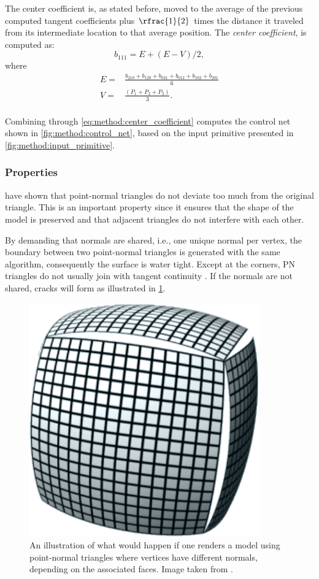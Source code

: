 	The center coefficient is, as stated before, moved to the average of the previous computed tangent coefficients plus $\rfrac{1}{2}$ times the distance it traveled from its intermediate location to that average position. The \textit{center coefficient}, is computed as:
	\begin{equation}\label{eq:method:center_coefficient}
		b_{111} = E + (E - V) / 2,
	\end{equation}
	where
	\begin{align*}
		E = {}& \frac{b_{210} + b_{120} + b_{021} + b_{012} + b_{102} + b_{201}}{6}\\
		V = {}& \frac{(P_1 + P_2 + P_3)}{3}. \\
	\end{align*}

	Combining  through \ref{eq:method:center_coefficient} computes the control net shown in \cref{fig:method:control_net}, based on the input primitive presented in \cref{fig:method:input_primitive}.

\subsubsection{Properties}
\label{sss:method:geometry:properties}
	\citeauthor{vlachos2001curved} have shown that point-normal triangles do not deviate too much from the original triangle. This is an important property since it ensures that the shape of the model is preserved and that adjacent triangles do not interfere with each other. 

	By demanding that normals are shared, i.e., one unique normal per vertex, the boundary between two point-normal triangles is generated with the same algorithm, consequently the surface is water tight. Except at the corners, PN triangles do not usually join with tangent continuity \cite{vlachos2001curved}. If the normals are not shared, cracks will form as illustrated in \cref{fig:method:cracks}.

	\begin{figure}
		\centering
		\includegraphics[width=0.4\columnwidth]{./content/img/method/cracks.png}
		\caption{An illustration of what would happen if one renders a model using point-normal triangles where vertices have different normals, depending on the associated faces. Image taken from \cite{mcdonald2010crack}.}
		\label{fig:method:cracks}
	\end{figure}
